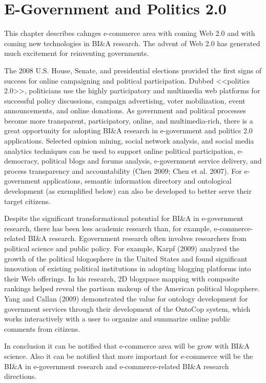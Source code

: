 \section{E-Government and Politics 2.0}

This chapter describes cahnges e-commerce area with coming Web 2.0
and with coming new technologies in BI\&A research. The advent of Web 2.0 has generated much excitement for
reinventing governments. 

The 2008 U.S. House, Senate, and
presidential elections provided the first signs of success for
online campaigning and political participation. Dubbed
<<politics 2.0>>, politicians use the highly participatory and
multimedia web platforms for successful policy discussions,
campaign advertising, voter mobilization, event announcements,
and online donations. As government and political
processes become more transparent, participatory, online, and
multimedia-rich, there is a great opportunity for adopting
BI\&A research in e-government and politics 2.0 applications.
Selected opinion mining, social network analysis, and social
media analytics techniques can be used to support online
political participation, e-democracy, political blogs and
forums analysis, e-government service delivery, and process
transparency and accountability (Chen 2009; Chen et al.
2007). For e-government applications, semantic information
directory and ontological development (as exemplified below)
can also be developed to better serve their target citizens.

Despite the significant transformational potential for BI\&A in
e-government research, there has been less academic research
than, for example, e-commerce-related BI\&A research. Egovernment
research often involves researchers from political
science and public policy. For example, Karpf (2009) analyzed
the growth of the political blogosphere in the United
States and found significant innovation of existing political
institutions in adopting blogging platforms into their Web
offerings. In his research, 2D blogspace mapping with composite
rankings helped reveal the partisan makeup of the
American political blogsphere. Yang and Callan (2009)
demonstrated the value for ontology development for government
services through their development of the OntoCop
system, which works interactively with a user to organize and
summarize online public comments from citizens.

In conclusion it can be notified that e-commerce area will be grow with BI\&A science. Also it can be notified that more important for e-commerce will be the BI\&A in e-government research and e-commerce-related BI\&A research directions.